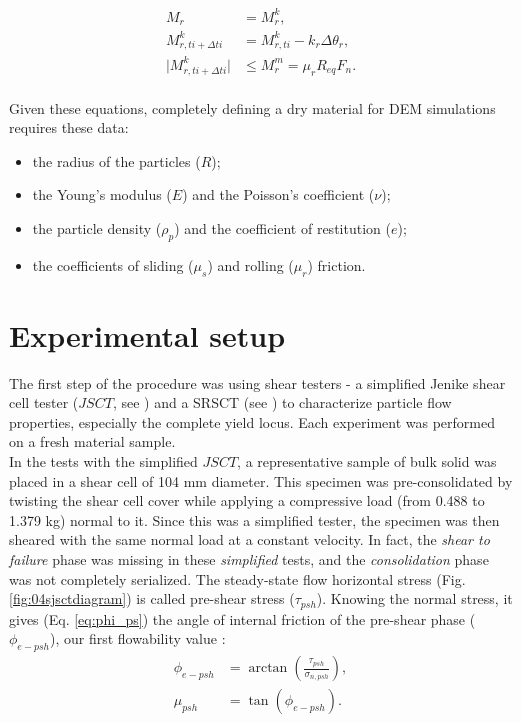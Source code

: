 \documentclass{CFD2015}
\begin{document}
\begin{equation}
\begin{aligned}
M_r &= M_r^k ,\\
M_{r,ti+\Delta ti}^k &= M_{r,ti}^k - k_r \Delta \theta_r ,\\
\lvert{M_{r,ti+\Delta ti}^k}\rvert & \leq M_r^m = \mu_r R_{eq} F_n .\\
\end{aligned}
 \label{eq:mrtm}
\end{equation}


Given these equations, completely defining a dry material for DEM simulations requires these data:
\begin{itemize}
\item{the radius of the particles ($R$);}
\item{the Young's modulus ($E$) and the Poisson's coefficient ($\nu$);}
\item{the particle density ($\rho_p$) and the coefficient of restitution ($e$);}
\item{the coefficients of sliding ($\mu_s$) and rolling ($\mu_r$) friction.}
\end{itemize}


\section{Experimental setup}
The first step of the procedure was using shear testers - 
a simplified Jenike shear cell tester ($JSCT$, see \citet{RefWorks:114}) and a SRSCT (see \citet{RefWorks:142})
to characterize particle flow properties, especially the complete yield locus.
Each experiment was performed on a fresh material sample. \\
In the tests with the simplified $JSCT$, a representative sample of bulk solid was placed in a shear cell of 104 mm diameter. 
This specimen was pre-consolidated by twisting the shear cell cover while applying a compressive load (from 0.488 to 1.379 kg) normal to it.
Since this was a simplified tester, the specimen was then sheared with the same normal load at a constant velocity. 
In fact, the \textit{shear to failure} phase was missing in these \textit{simplified} tests, and the \textit{consolidation} phase was not completely serialized.
The steady-state flow horizontal stress (Fig. \ref{fig:04sjsctdiagram}) is called pre-shear stress ($\tau_{psh}$). Knowing the normal stress, it gives (Eq. \ref{eq:phi_ps}) the angle of internal friction of the pre-shear phase ($\phi_{e-psh}$), our first flowability value \cite{RefWorks:118}:
\begin{equation}
\begin{aligned}
\phi_{e-psh} &= \arctan \left(\frac{\tau_{psh}}{\sigma_{n,psh}} \right) ,\\
\mu_{psh} &=\tan(\phi_{e-psh}) .
\end{aligned}
 \label{eq:phi_ps}
\end{equation}
\end{document}
